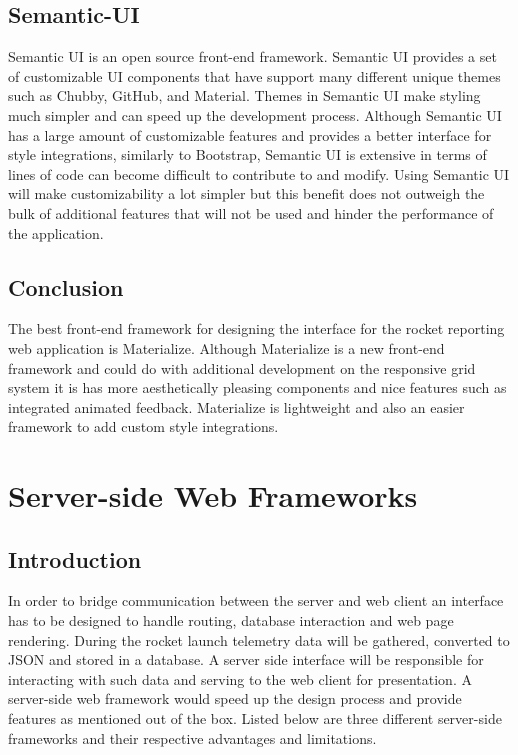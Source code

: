\documentclass[onecolumn, draftclsnofoot,10pt, compsoc]{IEEEtran}
\begin{document}
\subsection{Semantic-UI}
Semantic UI is an open source front-end framework. Semantic UI provides a set of customizable UI components that have support many different unique themes such as Chubby, GitHub, and Material. Themes in Semantic UI make styling much simpler and can speed up the development process. Although Semantic UI has a large amount of customizable features and provides a better interface for style integrations, similarly to Bootstrap, Semantic UI is extensive in terms of lines of code can become difficult to contribute to and modify. Using Semantic UI will make customizability a lot simpler but this benefit does not outweigh the bulk of additional features that will not be used and hinder the performance of the application.
\subsection{Conclusion}
The best front-end framework for designing the interface for the rocket reporting web application is Materialize. Although Materialize is a new front-end framework and could do with additional development on the responsive grid system it is has more aesthetically pleasing components and nice features such as integrated animated feedback. Materialize is lightweight and also an easier framework to add custom style integrations.
\section{Server-side Web Frameworks}
\subsection{Introduction}
In order to bridge communication between the server and web client an interface has to be designed to handle routing, database interaction and web page rendering. During the rocket launch telemetry data will be gathered, converted to JSON and stored in a database. A server side interface will be responsible for interacting with such data and serving to the web client for presentation. A server-side web framework would speed up the design process and provide features as mentioned out of the box. Listed below are three different server-side frameworks and their respective advantages and limitations. 
\end{document}
